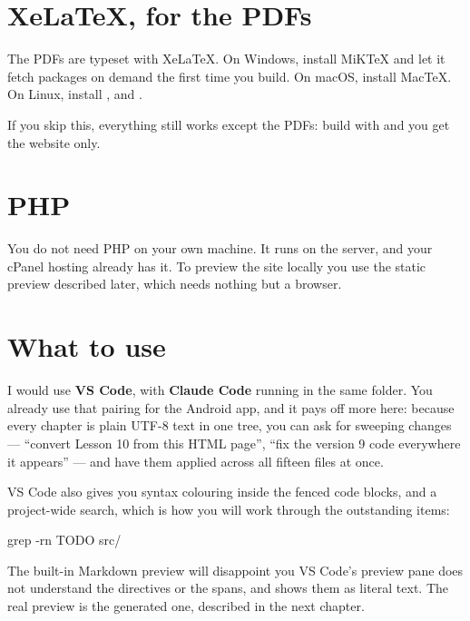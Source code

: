 \documentclass{symbulator}
\begin{document}
\section{XeLaTeX, for the PDFs}

The PDFs are typeset with XeLaTeX. On Windows, install MiKTeX and let it fetch
packages on demand the first time you build. On macOS, install MacTeX. On
Linux, install ,  and
.

If you skip this, everything still works except the PDFs: build with
 and you get the website only.

\section{PHP}

You do not need PHP on your own machine. It runs on the server, and your cPanel
hosting already has it. To preview the site locally you use the static preview
described later, which needs nothing but a browser.


\section{What to use}

I would use \textbf{VS Code}, with \textbf{Claude Code} running in the same
folder. You already use that pairing for the Android app, and it pays off more
here: because every chapter is plain UTF-8 text in one tree, you can ask for
sweeping changes --- ``convert Lesson 10 from this HTML page'', ``fix the
version 9 code everywhere it appears'' --- and have them applied across all
fifteen files at once.

VS Code also gives you syntax colouring inside the fenced code blocks, and a
project-wide search, which is how you will work through the outstanding items:

\begin{symtype}
grep -rn TODO src/
\end{symtype}

\begin{calloutnote}{The built-in Markdown preview will disappoint you}
VS Code's preview pane does not understand the \symcode{:::} directives or the
 spans, and shows them as literal text. The real preview
is the generated one, described in the next chapter.
\end{calloutnote}
\end{document}
